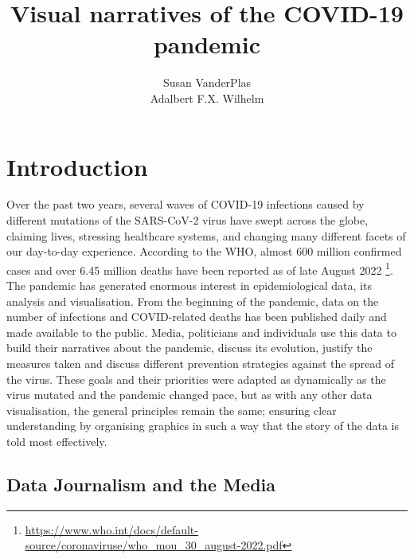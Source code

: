 \documentclass[article]{jdssv}\usepackage[]{graphicx}\usepackage[]{color}
\author{Susan VanderPlas\\
\affiliation{Statistics Department\\ University of Nebraska Lincoln\\ United States}
   \And Adalbert F.X. Wilhelm \\ \affiliation{School for Business\\ Social and Decision Sciences\\ Jacobs University Bremen}}
\title{Visual narratives of the COVID-19 pandemic}
\begin{document}







\section{Introduction}

Over the past two years, several waves of COVID-19 infections caused by different mutations of the SARS-CoV-2 virus have swept across the globe, claiming lives, stressing healthcare systems, and changing many different facets of our day-to-day experience. According to the WHO, almost 600 million confirmed cases and over 6.45 million deaths have been reported as of late August 2022 \footnote{\url{https://www.who.int/docs/default-source/coronaviruse/who_mou_30_august-2022.pdf}}. The pandemic has generated enormous interest in epidemiological data, its analysis and visualisation. From the beginning of the pandemic, data on the number of infections and COVID-related deaths has been published daily and made available to the public. Media, politicians and individuals use this data to build their narratives about the pandemic, discuss its evolution, justify the measures taken and discuss different prevention strategies against the spread of the virus. %
These goals and their priorities were adapted as dynamically as the virus mutated and the pandemic changed pace, but as with any other data visualisation, the general principles remain the same; ensuring clear understanding by organising graphics in such a way that the story of the data is told most effectively.

\subsection{Data Journalism and the Media}
\end{document}
